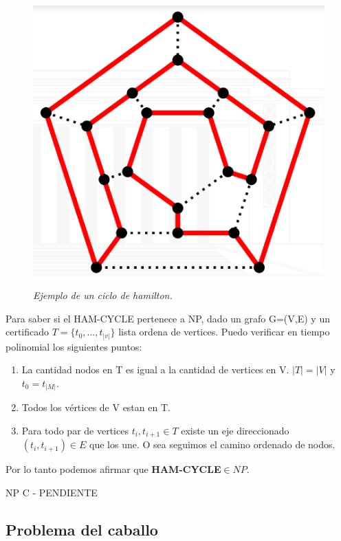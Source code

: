 \documentclass{article}
\begin{document}
\begin{figure}[h!]
    \begin{center} 
    \includegraphics[scale=0.3]{imagenes/ejemplo-ciclo-hamilton.png}
    \caption{\small \sl Ejemplo de un ciclo de hamilton.\label{fig:hamilton-ej}} 
    \end{center}
\end{figure}

Para saber si el HAM-CYCLE pertenece a NP, dado un grafo G=(V,E) 
y un certificado \(T = \{t_0,...,t_{|v|}\}\) lista ordena de vertices.
Puedo verificar en tiempo polinomial los siguientes puntos:

\begin{enumerate}
    \item La cantidad nodos en T es igual a la cantidad de vertices en V. \(|T|=|V|\) y \(t_0=t_|M|\).
    \item Todos los vértices de V estan en T.
    \item Para todo par de vertices \(t_i, t_{i+1} \in T\) existe un eje direccionado \((t_i, t_{i+1}) \in E\) que los une. 
    O sea seguimos el camino ordenado de nodos.
\end{enumerate}

Por lo tanto podemos afirmar que \textbf{HAM-CYCLE}\(\in NP\).

NP C - PENDIENTE
\newpage
\subsection{Problema del caballo}
\end{document}
